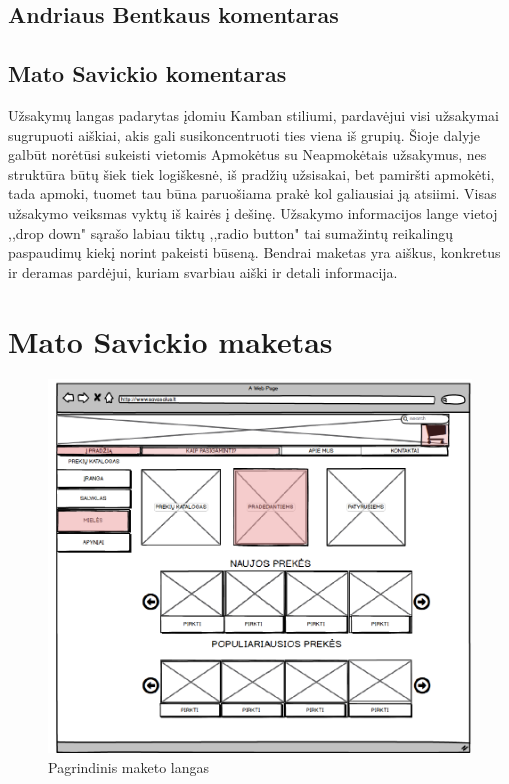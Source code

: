 \documentclass[oneside]{VUMIFPSkursinis}
\begin{document}
	
	\subsection{Andriaus Bentkaus komentaras}
	\subsection{Mato Savickio komentaras}
Užsakymų langas padarytas įdomiu Kamban stiliumi, pardavėjui visi užsakymai sugrupuoti aiškiai, akis gali susikoncentruoti ties viena iš grupių. Šioje dalyje galbūt norėtūsi sukeisti vietomis Apmokėtus su Neapmokėtais užsakymus, nes struktūra būtų šiek tiek logiškesnė, iš pradžių užsisakai, bet pamiršti apmokėti, tada apmoki, tuomet tau būna paruošiama prakė kol galiausiai ją atsiimi. Visas užsakymo veiksmas vyktų iš kairės į dešinę. Užsakymo informacijos lange vietoj ,,drop down"  sąrašo labiau tiktų ,,radio button" tai sumažintų reikalingų paspaudimų kiekį norint pakeisti būseną. Bendrai maketas yra aiškus, konkretus ir deramas pardėjui, kuriam svarbiau aiški ir detali informacija.

\section{Mato Savickio maketas}
	\begin{figure}
  		\includegraphics[width=\linewidth]{mak1.png}
  		\caption{Pagrindinis maketo langas}
 		 \label{fig:mak1}
	\end{figure}
\end{document}
